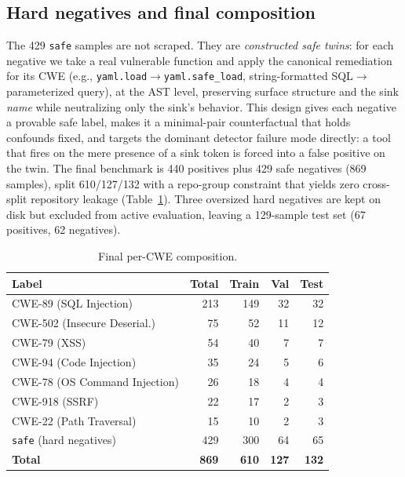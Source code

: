 \documentclass[conference]{IEEEtran}
\begin{document}
\subsection{Hard negatives and final composition}
The 429 \texttt{safe} samples are not scraped. They are \emph{constructed
safe twins}: for each negative we take a real vulnerable function and
apply the canonical remediation for its CWE (e.g.,
\texttt{yaml.load}$\rightarrow$\texttt{yaml.safe\_load}, string-formatted
SQL$\rightarrow$parameterized query), at the AST level, preserving
surface structure and the sink \emph{name} while neutralizing only the
sink's behavior. This design gives each negative a provable safe label,
makes it a minimal-pair counterfactual that holds confounds fixed, and
targets the dominant detector failure mode directly: a tool that fires
on the mere presence of a sink token is forced into a false positive on
the twin. The final benchmark is 440 positives plus 429 safe negatives
(869 samples), split 610/127/132 with a repo-group constraint that
yields zero cross-split repository leakage (Table~\ref{tab:composition}).
Three oversized hard negatives are kept on disk but excluded from active
evaluation, leaving a 129-sample test set (67 positives, 62 negatives).

\begin{table}[t]
\caption{Final per-CWE composition.}
\label{tab:composition}
\centering
\begin{tabular}{lrrrr}
\toprule
\textbf{Label} & \textbf{Total} & \textbf{Train} & \textbf{Val} & \textbf{Test} \\
\midrule
CWE-89 (SQL Injection)             & 213 & 149 & 32 & 32 \\
CWE-502 (Insecure Deserial.)       &  75 &  52 & 11 & 12 \\
CWE-79 (XSS)                       &  54 &  40 &  7 &  7 \\
CWE-94 (Code Injection)            &  35 &  24 &  5 &  6 \\
CWE-78 (OS Command Injection)      &  26 &  18 &  4 &  4 \\
CWE-918 (SSRF)                     &  22 &  17 &  2 &  3 \\
CWE-22 (Path Traversal)            &  15 &  10 &  2 &  3 \\
\texttt{safe} (hard negatives)     & 429 & 300 & 64 & 65 \\
\midrule
\textbf{Total}                     & \textbf{869} & \textbf{610} & \textbf{127} & \textbf{132} \\
\bottomrule
\end{tabular}
\end{table}
\end{document}
